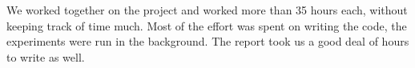 
\noindent We worked together on the project and worked more than 35 hours each, without keeping track of time much. Most of the effort was spent on writing the code, the experiments were run in the background. The report took us a good deal of hours to write as well.